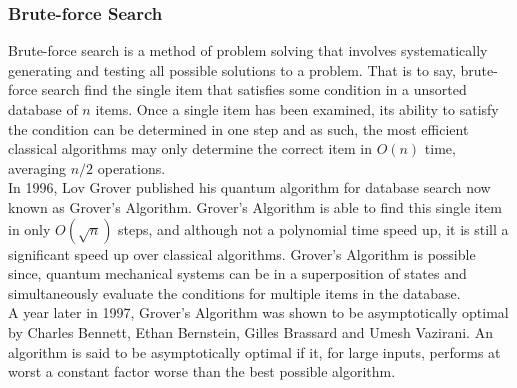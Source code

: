 \documentclass[reqno]{amsart}
\numberwithin{equation}{section}
\numberwithin{figure}{section}
\begin{document}
\subsubsection{Brute-force Search}
\begin{justify}
Brute-force search is a method of problem solving that involves systematically generating and testing all possible solutions to a problem. That is to say, brute-force search find the single item that satisfies some condition in a unsorted database of $n$ items. Once a single item has been examined, its ability to satisfy the condition can be determined in one step and as such, the most efficient classical algorithms may only determine the correct item in $O(n)$ time, averaging $n/2$ operations. \\

In 1996, Lov Grover published his quantum algorithm for database search \cite{Grover1996} now known as Grover's Algorithm. Grover's Algorithm is able to find this single item in only $O(\sqrt{n})$ steps, and although not a polynomial time speed up, it is still a significant speed up over classical algorithms. Grover's Algorithm is possible since, quantum mechanical systems can be in a superposition of states and simultaneously evaluate the conditions for multiple items in the database. \\

A year later in 1997, Grover's Algorithm was shown to be asymptotically optimal by Charles Bennett, Ethan Bernstein, Gilles Brassard and Umesh Vazirani. \cite{BennettBernsteinBrassardVazirani1997} An algorithm is said to be asymptotically optimal if it, for large inputs, performs at worst a constant factor worse than the best possible algorithm.
\end{justify}
\end{document}
